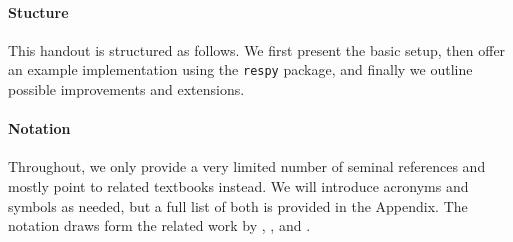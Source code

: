 \paragraph{Stucture} This handout is structured as follows. We first present the basic setup, then offer an example implementation using the \verb+respy+ package, and finally we outline possible improvements and extensions.

\paragraph{Notation} Throughout, we only provide a very limited number of seminal references and mostly point to related textbooks instead. We will introduce acronyms and symbols as needed, but a full list of both is provided in the Appendix. The notation draws form the related work by \cite{Puterman.1994}, \cite{Aguirregabiria.2010}, and \cite{Arcidiacono.2011}.
